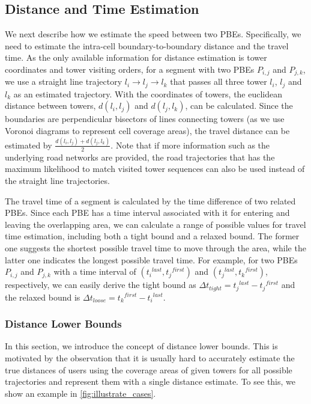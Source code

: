 \subsection{Distance and Time Estimation}

We next describe how we estimate the speed between two PBEs. Specifically, we need to estimate the intra-cell boundary-to-boundary distance and the travel time. As the only available information for distance estimation is tower coordinates and tower visiting orders, for a segment with two PBEs $P_{i,j}$ and $P_{j,k}$, we use a straight line trajectory $l_i \rightarrow l_j \rightarrow l_k$ that passes all three tower $l_i$, $l_j$ and $l_k$ as an estimated trajectory. With the coordinates of towers, the euclidean distance between towers, $d(l_i,l_j)$ and $d(l_j,l_k)$, can be calculated. Since the boundaries are perpendicular bisectors of lines connecting towers (as we use Voronoi diagrams to represent cell coverage areas), the travel distance can be estimated by $\frac{d(l_i,l_j) + d(l_j,l_k)}{2}$. Note that if more information such as the underlying road networks are provided, the road trajectories that has the maximum likelihood to match visited tower sequences can also be used instead of the straight line trajectories.

The travel time of a segment is calculated by the time difference of two related PBEs. Since each PBE has a time interval associated with it for entering and leaving the overlapping area, we can calculate a range of possible values for travel time estimation, including both a tight bound and a relaxed bound. The former one suggests the shortest possible travel time to move through the area, while the latter one indicates the longest possible travel time. For example, for two PBEs $P_{i,j}$ and $P_{j,k}$ with a time interval of $({t_i}^{last}, {t_j}^{first})$ and $({t_j}^{last}, {t_k}^{first})$, respectively, we can easily derive the tight bound as $\Delta t_{tight} = {t_j}^{last} - {t_j}^{first}$ and the relaxed bound is $\Delta t_{loose} = {t_k}^{first} - {t_i}^{last}$.

\subsubsection{Distance Lower Bounds}

In this section, we introduce the concept of distance lower bounds. This is motivated by the observation that it is usually hard to accurately estimate the true distances of users using the coverage areas of given towers for all possible trajectories and represent them with a single distance estimate. To see this, we show an example in \autoref{fig:illustrate_cases}.

